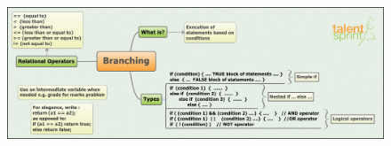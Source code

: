 \documentclass[11pt,a4paper]{article}
\begin{document}
\vfill{\ }
\begin{figure}[H]
 \begin{center}
   \includegraphics[angle=90,height=20cm, width=13cm]{Branching.png}
   
 \end{center}
 \end{figure}
\end{document}
